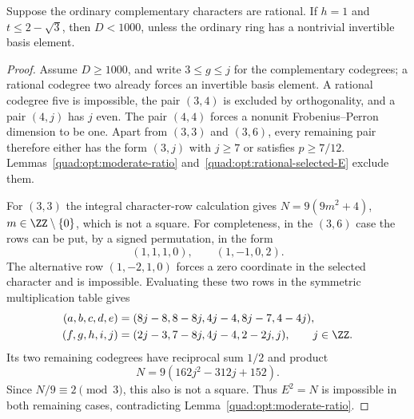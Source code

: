 \begin{lemma}\label{quad:opt:rational-complement-moderate}
Suppose the ordinary complementary characters are rational.
If $h=1$ and $t\le2-\sqrt3$, then $D<1000$, unless the ordinary
ring has a nontrivial invertible basis element.
\end{lemma}
\begin{proof}
Assume $D\ge1000$, and write $3\le g\le j$ for the complementary
codegrees; a rational codegree two already forces an invertible
basis element. A rational codegree five is impossible, the pair
$(3,4)$ is excluded by orthogonality, and a pair $(4,j)$ has $j$ even.
The pair $(4,4)$ forces a nonunit Frobenius--Perron dimension to be
one. Apart from $(3,3)$ and $(3,6)$, every remaining pair therefore
either has the form $(3,j)$ with $j\ge7$ or satisfies $p\ge7/12$.
Lemmas~\ref{quad:opt:moderate-ratio} and~\ref{quad:opt:rational-selected-E}
exclude them.

For $(3,3)$ the integral character-row calculation gives
$N=9(9m^2+4)$, $m\in\ZZ\setminus\{0\}$, which is not a square.
For completeness, in the $(3,6)$ case the rows can be put, by a
signed permutation, in the form
\[
 (1,1,1,0),\qquad(1,-1,0,2).
\]
The alternative row $(1,-2,1,0)$ forces a zero coordinate in the
selected character and is impossible. Evaluating these two rows in
the symmetric multiplication table gives
\[
 \begin{aligned}
 (a,b,c,d,e)&=(8j-8,8-8j,4j-4,8j-7,4-4j),\\
 (f,g,h,i,j)&=(2j-3,7-8j,4j-4,2-2j,j),\qquad j\in\ZZ.
 \end{aligned}
\]
Its two remaining codegrees have reciprocal sum $1/2$ and product
\[
 N=9(162j^2-312j+152).
\]
Since $N/9\equiv2\pmod3$, this also is not a square.
Thus $E^2=N$ is impossible in both remaining cases, contradicting
Lemma~\ref{quad:opt:moderate-ratio}.
\end{proof}

